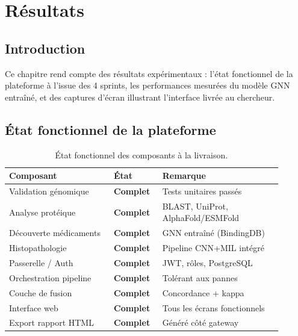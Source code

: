 \documentclass[12pt,a4paper,oneside]{book}
\begin{document}
\chapter{Résultats}
\label{ch:resultats}

\section*{Introduction}
Ce chapitre rend compte des résultats expérimentaux : l'état fonctionnel
de la plateforme à l'issue des 4 sprints, les performances mesurées du
modèle GNN entraîné, et des captures d'écran illustrant l'interface livrée
au chercheur.

\section{État fonctionnel de la plateforme}

\begin{table}[H]
\caption{État fonctionnel des composants à la livraison.}
\label{tab:etat}
\centering
\renewcommand{\arraystretch}{1.3}
\begin{tabular}{L{0.35\linewidth} C{0.15\linewidth} L{0.40\linewidth}}
\toprule
\textbf{Composant} & \textbf{État} & \textbf{Remarque} \\
\midrule
Validation génomique     & \textcolor{green!60!black}{\textbf{Complet}} & Tests unitaires passés \\
Analyse protéique        & \textcolor{green!60!black}{\textbf{Complet}} & BLAST, UniProt, AlphaFold/ESMFold \\
Découverte médicaments   & \textcolor{green!60!black}{\textbf{Complet}} & GNN entraîné (BindingDB) \\
Histopathologie          & \textcolor{green!60!black}{\textbf{Complet}} & Pipeline CNN+MIL intégré \\
Passerelle / Auth        & \textcolor{green!60!black}{\textbf{Complet}} & JWT, rôles, PostgreSQL \\
Orchestration pipeline   & \textcolor{green!60!black}{\textbf{Complet}} & Tolérant aux pannes \\
Couche de fusion         & \textcolor{green!60!black}{\textbf{Complet}} & Concordance + kappa \\
Interface web            & \textcolor{green!60!black}{\textbf{Complet}} & Tous les écrans fonctionnels \\
Export rapport HTML      & \textcolor{green!60!black}{\textbf{Complet}} & Généré côté gateway \\
\bottomrule
\end{tabular}
\end{table}
\end{document}
